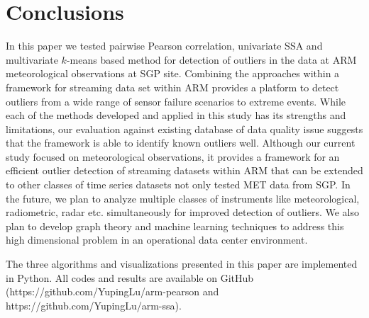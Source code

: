 \section{Conclusions}
In this paper we tested pairwise Pearson correlation,
univariate SSA and multivariate $k$-means based method for detection of
outliers in the data at ARM meteorological observations at SGP site. 
Combining the approaches within a framework for
streaming data set within ARM provides a platform to detect outliers
from a wide range of sensor failure scenarios to extreme events.
While each of the methods developed and applied in this study has its
strengths and limitations, our evaluation against existing database of
data quality issue suggests that the framework is able to identify known
outliers well. Although our current study focused on
meteorological observations, it provides a framework for an efficient
outlier detection of streaming datasets within ARM that can be extended to
other classes of time series datasets not only tested MET data from SGP. 
In the future, we plan to analyze multiple
classes of instruments like meteorological, radiometric, radar etc.
simultaneously for improved detection of outliers. We also plan to
develop graph theory \cite{phillips2015graph} and machine learning techniques to address this
high dimensional problem in an operational data center environment.

The three algorithms and visualizations presented in this paper are 
implemented in Python. All codes and results are available on GitHub 
(https://github.com/YupingLu/arm-pearson and https://github.com/YupingLu/arm-ssa). 
